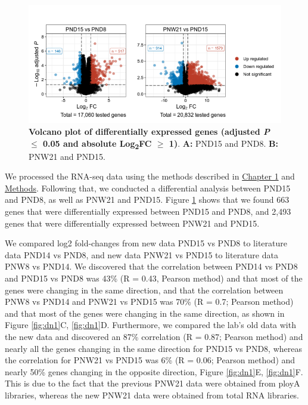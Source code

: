 \documentclass[12pt,twoside]{reedthesis}
\begin{document}
\begin{figure}[htbp]

{\centering \includegraphics{thesis_files/figure-latex/dn2-1} 

}

\caption[Volcano plot of differentially expressed genes]{\textbf{Volcano plot of differentially expressed genes (adjusted \textit{P} $\leq$ 0.05 and absolute Log\textsubscript{2}FC $\geq$ 1)}.\newline
\textbf{A:} PND15 and PND8. \newline \textbf{B:} PNW21 and PND15.}\label{fig:dn2}
\end{figure}
We processed the RNA-seq data using the methods described in \protect\hyperlink{chapter1}{Chapter
1}
and \protect\hyperlink{methods}{Methods}. Following that, we conducted a differential analysis
between PND15 and PND8, as well as PNW21 and PND15. Figure \ref{fig:dn2} shows that
we found 663 genes that were differentially expressed between PND15 and
PND8, and 2,493 genes that were differentially expressed between PNW21
and PND15.

We compared log2 fold-changes from new data PND15 vs PND8 to literature
data PND14 vs PND8, and new data PNW21 vs PND15 to literature data PNW8
vs PND14. We discovered that the correlation between PND14 vs PND8 and
PND15 vs PND8 was 43\% (R = 0.43, Pearson method) and that most of the
genes were changing in the same direction, and that the correlation
between PNW8 vs PND14 and PNW21 vs PND15 was 70\% (R = 0.7; Pearson
method) and that most of the genes were changing in the same direction,
as shown in Figure \ref{fig:dn1}C, \ref{fig:dn1}D. Furthermore, we compared the lab's old data
with the new data and discovered an 87\% correlation (R = 0.87; Pearson
method) and nearly all the genes changing in the same direction for
PND15 vs PND8, whereas the correlation for PNW21 vs PND15 was 6\% (R =
0.06; Pearson method) and nearly 50\% genes changing in the opposite
direction, Figure \ref{fig:dn1}E, \ref{fig:dn1}F. This is due to the fact that the previous
PNW21 data were obtained from ployA libraries, whereas the new PNW21
data were obtained from total RNA libraries.
\end{document}
